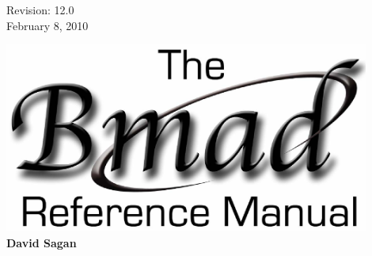 \thispagestyle{empty}

\begin{flushright}
\large
  Revision: 12.0 \\
  February 8, 2010 \\
\end{flushright}

\vfill

{
\begin{center}
\includegraphics[width=12cm]{bmad-ref-manual.eps} \\
\vskip 0.3in
\huge\bf David Sagan
\end{center}
}

\vfill
\break

